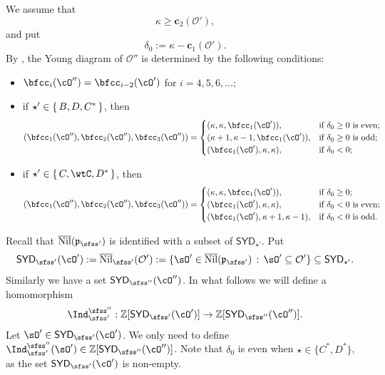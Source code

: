 \documentclass[11pt,a4paper]{amsart}
\def\SYD{{\mathsf{SYD}}}
\newcommand{\CO}{{\mathcal {O}}}
\newcommand{\p}{\mathfrak p}
\newcommand{\Z}{\mathbb{Z}}
\newcommand{\be}{\begin {equation}}
\newcommand{\ee}{\end {equation}}
\numberwithin{equation}{section}
\theoremstyle{remark}
\def\subset{\subseteq}
\def\Nil{\overline{\mathrm{Nil}}}
\def\cOp{\cO^{\prime}}
\def\cOpp{\cO^{\prime\prime}}
\def\SYD{{\mathsf{SYD}}}
\begin{document}
We assume that 
\[
\kappa \geq \mathbf c_2(\CO'),
\]
and put 
\be \label{eq:tzero}
  \delta_0:=\kappa -\mathbf c_1(\CO'). 
\ee
By \cite[Theorem 7.3.3]{CM}, the Young diagram of $\CO''$ is determined by the following conditions:
\begin{itemize}
    \item $\bfcc_i(\cOpp)=\bfcc_{i-2}(\cOp)$ for $i=4,5,6,\dots$; 
    \item if $\star'\in \set{B,D, C^*}$,
    then
    \[
      (\bfcc_1(\cOpp), \bfcc_2(\cOpp),\bfcc_3(\cOpp))
      =\begin{cases}
        (\kappa,\kappa,\bfcc_1(\cOp)),     & \text{if $\delta_0\geq 0$ is even}; \\
          (\kappa+1,\kappa-1,\bfcc_1(\cOp)), & \text{if $\delta_0\geq 0$ is odd};  \\
          (\bfcc_1(\cOp),\kappa,\kappa),     & \text{if $\delta_0<0$};             \\
      \end{cases}
    \]
    \item  if $\star'\in \set{C,\wtC, D^*}$,
    then
    \[
      (\bfcc_1(\cOpp), \bfcc_2(\cOpp),\bfcc_3(\cOpp))
      =\begin{cases}
        (\kappa,\kappa,\bfcc_1(\cOp)),     & \text{if $\delta_0\geq 0$}; \\
        (\bfcc_1(\cOp),\kappa,\kappa), & \text{if $\delta_0 < 0$ is even};  \\
        (\bfcc_1(\cOp),\kappa +1,\kappa-1),     & \text{if $\delta_0<0$ is odd}.             \\
      \end{cases}
    \]
\end{itemize}


Recall that $\Nil(\p_{\sfss'})$ is identified with a subset of $\SYD_{\star'}$.  Put 
\[
\SYD_{\sfss'}(\cO'):=\Nil_{\sfss'}(\CO'):=\{\sO'\in \Nil(\p_{\sfss'})\,:\, \sO'\subset \CO'\}\subset \SYD_{\star'}.
\]
Similarly we have a set  $\SYD_{\sfss''}(\cO'')$. In what follows we will define a homomorphism  
\[
  \Ind_{\sfss'}^{\sfss''}: \Z[\SYD_{\sfss'}(\cO')] \rightarrow \Z[\SYD_{\sfss''}(\cO'')].
\]
Let $\sOp\in
\SYD_{\sfss'}(\cOp)$. We only need to define $\Ind_{\sfss'}^{\sfss''}(\sO')\in \Z[\SYD_{\sfss''}(\cO'')]$. Note that $\delta_0$ is even when $\star\in \{C^*, D^*\}$, as the set $\SYD_{\sfss'}(\cOp)$ is non-empty. 

\medskip 
\end{document}
